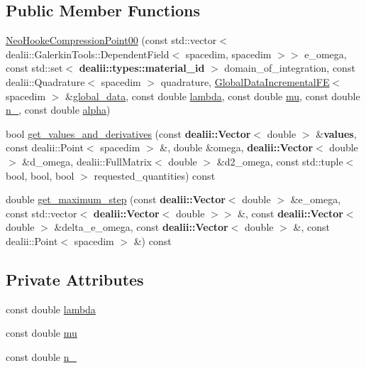 \subsection*{Public Member Functions}
\begin{DoxyCompactItemize}
\item 
\hyperlink{classincremental_f_e_1_1_neo_hooke_compression_point00_a8ebddd648a42cf4ff992b8e2db221f42}{Neo\+Hooke\+Compression\+Point00} (const std\+::vector$<$ dealii\+::\+Galerkin\+Tools\+::\+Dependent\+Field$<$ spacedim, spacedim $>$$>$ e\+\_\+omega, const std\+::set$<$ {\bf dealii\+::types\+::material\+\_\+id} $>$ domain\+\_\+of\+\_\+integration, const dealii\+::\+Quadrature$<$ spacedim $>$ quadrature, \hyperlink{classincremental_f_e_1_1_global_data_incremental_f_e}{Global\+Data\+Incremental\+FE}$<$ spacedim $>$ \&\hyperlink{classincremental_f_e_1_1_psi_3_01spacedim_00_01spacedim_01_4_abf0a4804877fd7cc9bd1b90e52760ba9}{global\+\_\+data}, const double \hyperlink{classincremental_f_e_1_1_neo_hooke_compression_point00_a1b1c0c8dcca2410288a9ef014a117870}{lambda}, const double \hyperlink{classincremental_f_e_1_1_neo_hooke_compression_point00_a647e6e22708201ca6093e1daeaf7326c}{mu}, const double \hyperlink{classincremental_f_e_1_1_neo_hooke_compression_point00_aba531cf944d6455c9aebc49bdcb45019}{n\+\_}, const double \hyperlink{classincremental_f_e_1_1_psi_3_01spacedim_00_01spacedim_01_4_af7b8227188dbdd6ada35b9445d96c79d}{alpha})
\item 
bool \hyperlink{classincremental_f_e_1_1_neo_hooke_compression_point00_a3cbc7f4424b81aaf3b5b55f91805eaed}{get\+\_\+values\+\_\+and\+\_\+derivatives} (const {\bf dealii\+::\+Vector}$<$ double $>$ \&{\bf values}, const dealii\+::\+Point$<$ spacedim $>$ \&, double \&omega, {\bf dealii\+::\+Vector}$<$ double $>$ \&d\+\_\+omega, dealii\+::\+Full\+Matrix$<$ double $>$ \&d2\+\_\+omega, const std\+::tuple$<$ bool, bool, bool $>$ requested\+\_\+quantities) const 
\item 
double \hyperlink{classincremental_f_e_1_1_neo_hooke_compression_point00_a793ee493efd7bf05038d7afbaa5e5110}{get\+\_\+maximum\+\_\+step} (const {\bf dealii\+::\+Vector}$<$ double $>$ \&e\+\_\+omega, const std\+::vector$<$ {\bf dealii\+::\+Vector}$<$ double $>$$>$ \&, const {\bf dealii\+::\+Vector}$<$ double $>$ \&delta\+\_\+e\+\_\+omega, const {\bf dealii\+::\+Vector}$<$ double $>$ \&, const dealii\+::\+Point$<$ spacedim $>$ \&) const 
\end{DoxyCompactItemize}
\subsection*{Private Attributes}
\begin{DoxyCompactItemize}
\item 
const double \hyperlink{classincremental_f_e_1_1_neo_hooke_compression_point00_a1b1c0c8dcca2410288a9ef014a117870}{lambda}
\item 
const double \hyperlink{classincremental_f_e_1_1_neo_hooke_compression_point00_a647e6e22708201ca6093e1daeaf7326c}{mu}
\item 
const double \hyperlink{classincremental_f_e_1_1_neo_hooke_compression_point00_aba531cf944d6455c9aebc49bdcb45019}{n\+\_}
\end{DoxyCompactItemize}


